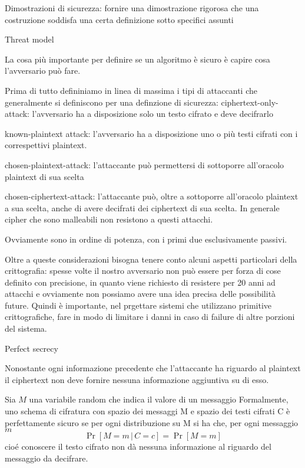 \voce Dimostrazioni di sicurezza: fornire una dimostrazione rigorosa che una costruzione
soddisfa una certa definizione sotto specifici assunti

\sezione Threat model

La cosa pi\`u importante per definire se un algoritmo \`e sicuro \`e capire
cosa l'avversario pu\`o fare.

Prima di tutto defininiamo in linea di massima i tipi di attaccanti che
generalmente si definiscono per una definzione di sicurezza:
\smallskip
\voce ciphertext-only-attack: l'avversario ha a disposizione solo un testo cifrato
e deve decifrarlo

\voce known-plaintext attack: l'avversario ha a disposizione uno o pi\`u testi cifrati
con i correspettivi plaintext.

\voce chosen-plaintext-attack: l'attaccante pu\`o permettersi di sottoporre all'oracolo
plaintext di sua scelta

\voce chosen-ciphertext-attack: l'attaccante pu\`o, oltre a sottoporre all'oracolo
plaintext a sua scelta, anche di avere decifrati dei ciphertext di sua scelta.
In generale cipher che sono malleabili non resistono a questi attacchi.

Ovviamente sono in ordine di potenza, con i primi due esclusivamente passivi.

Oltre a queste considerazioni bisogna tenere conto alcuni aspetti particolari della crittografia:
spesse volte il nostro avversario non pu\`o essere per forza di cose definito con precisione,
in quanto viene richiesto di resistere per 20 anni ad attacchi e ovviamente non possiamo avere
una idea precisa delle possibilit\`a future. Quindi \`e importante, nel prgettare sistemi che
utilizzano primitive crittografiche, fare in modo di limitare i danni in caso di failure di
altre porzioni del sistema.

\sezione Perfect secrecy

\citazione Nonostante ogni informazione precedente che l'attaccante ha riguardo al plaintext
il ciphertext non deve fornire nessuna informazione aggiuntiva su di esso.

Sia $M$ una variabile random che indica il valore di un messaggio
Formalmente, uno schema di cifratura con spazio dei messaggi \spazio M e spazio dei
testi cifrati \spazio C \`e perfettamente sicuro se per ogni distribuzione su \spazio M
si ha che, per ogni messaggio $m$
$$
\Pr[M=m\,|\,C=c] = \Pr[M=m]
$$
cio\'e conoscere il testo cifrato non d\`a nessuna informazione al riguardo del messaggio da decifrare.

